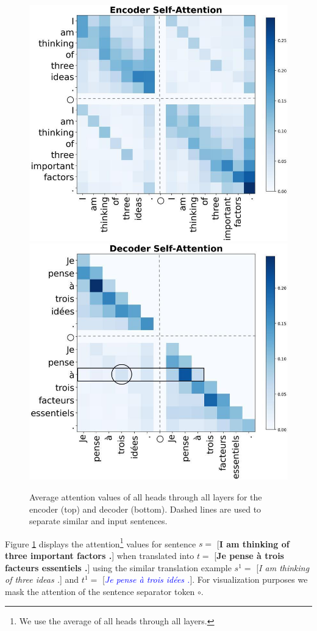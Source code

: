 \begin{figure}[h!]
    \includegraphics[width=.92\linewidth]{graphics/attention_enc.png}
    \includegraphics[width=.92\linewidth]{graphics/attention_dec.png}
\caption{Average attention values of all heads through all layers for the encoder (top) and decoder (bottom). Dashed lines are used to separate similar and input sentences.}
\label{fig:attn-chap8}
\end{figure}

Figure \ref{fig:attn-chap8} displays the attention\footnote{We use the average of all heads through all layers.} values for sentence $s=$ [{\bf I am thinking of three important factors .}] when translated into $t=$ [{\bf Je pense à trois facteurs essentiels .}] using the similar translation example $s^1=$ [{\it I am thinking of three ideas .}] and $t^1=$ [\textcolor{blue}{{\it Je pense à trois idées .}}]. For visualization purposes we mask the attention of the sentence separator token $\circ$.

